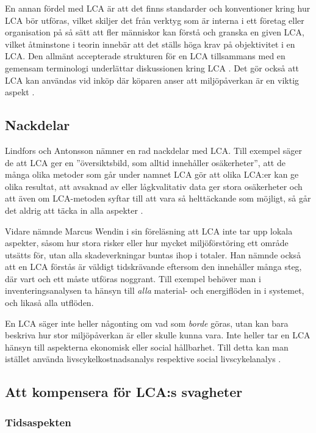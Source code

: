 \documentclass{article}
\begin{document}
En annan fördel med LCA är att det finns standarder och konventioner kring hur LCA bör utföras, vilket skiljer det från verktyg som är interna i ett företag eller organisation på så sätt att fler människor kan förstå och granska en given LCA, vilket åtminstone i teorin innebär att det ställs höga krav på objektivitet i en LCA. Den allmänt accepterade strukturen för en LCA tillsammans med en gemensam terminologi underlättar diskussionen kring LCA . Det gör också att LCA kan användas vid inköp där köparen anser att miljöpåverkan är en viktig aspekt .

\subsection{Nackdelar}

Lindfors och Antonsson nämner en rad nackdelar med LCA. Till exempel säger de att LCA ger en ''översikts\-bild, som alltid innehåller osäkerheter'', att de många olika metoder som går under namnet LCA gör att olika LCA:er kan ge olika resultat, att avsaknad av eller lågkvalitativ data ger stora osäkerheter och att även om LCA-metoden syftar till att vara så helttäckande som möjligt, så går det aldrig att täcka in alla aspekter .

Vidare nämnde Marcus Wendin i sin föreläsning att LCA inte tar upp lokala aspekter, såsom hur stora risker eller hur mycket miljöförstöring ett område utsätts för, utan alla skadeverkningar buntas ihop i totaler. Han nämnde också att en LCA förstås är väldigt tidskrävande eftersom den innehåller många steg, där vart och ett måste utföras noggrant. Till exempel behöver man i inventeringsanalysen ta hänsyn till \emph{alla} material- och energiflöden in i systemet, och likaså alla utflöden.

En LCA säger inte heller någonting om vad som \emph{borde} göras, utan kan bara beskriva hur stor miljö\-påverkan är eller skulle kunna vara. Inte heller tar en LCA hänsyn till aspekterna ekonomisk eller social hållbarhet. Till detta kan man istället använda livscykelkostnadsanalys respektive social livscykelanalys . 

\subsection{Att kompensera för LCA:s svagheter}

\subsubsection{Tidsaspekten}
\end{document}
